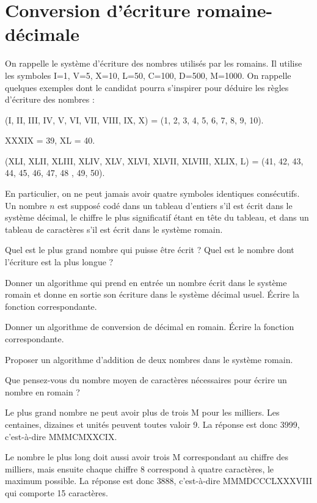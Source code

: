 \renewcommand{\SourceFile}{7-arithmetique-et-calculs-numeriques/src/7-2.ml}

\section{Conversion d'écriture romaine-décimale}

On rappelle le système d'écriture des nombres utilisés par les romains. Il utilise les symboles I=1, V=5, X=10, L=50, C=100, D=500, M=1000. On rappelle quelques exemples dont le candidat pourra s'inspirer pour déduire les règles d'écriture des nombres :
\medskip

(I, II, III, IV, V, VI, VII, VIII, IX, X) = (1, 2, 3, 4, 5, 6, 7, 8, 9, 10).
\medskip

XXXIX = 39, XL = 40.
\medskip

(XLI, XLII, XLIII, XLIV, XLV, XLVI, XLVII, XLVIII, XLIX, L) = (41, 42, 43, 44, 45, 46, 47, 48 , 49, 50).
\medskip

En particulier, on ne peut jamais avoir quatre symboles identiques consécutifs. Un nombre $n$ est supposé codé dans un tableau d'entiers s'il est écrit dans le système décimal, le chiffre le plus significatif étant en tête du tableau, et dans un tableau de caractères s'il est écrit dans le système romain.

\Q
Quel est le plus grand nombre qui puisse être écrit ? Quel est le nombre dont l'écriture est la plus longue ?

\Q
Donner un algorithme qui prend en entrée un nombre écrit dans le système romain et donne en sortie son écriture dans le système décimal usuel. Écrire la fonction correspondante.

\Q
Donner un algorithme de conversion de décimal en romain. Écrire la fonction correspondante.

\Q
Proposer un algorithme d'addition de deux nombres dans le système romain.

\Q
Que pensez-vous du nombre moyen de caractères nécessaires pour écrire un nombre en romain ?

\Corrige

\Q
Le plus grand nombre ne peut avoir plus de trois M pour les milliers. Les centaines, dizaines et unités peuvent toutes valoir 9. La réponse est donc 3999, c'est-à-dire MMMCMXXCIX.
\medskip

Le nombre le plus long doit aussi avoir trois M correspondant au chiffre des milliers, mais ensuite chaque chiffre 8 correspond à quatre caractères, le maximum possible. La réponse est donc 3888, c'est-à-dire MMMDCCCLXXXVIII qui comporte 15 caractères.

